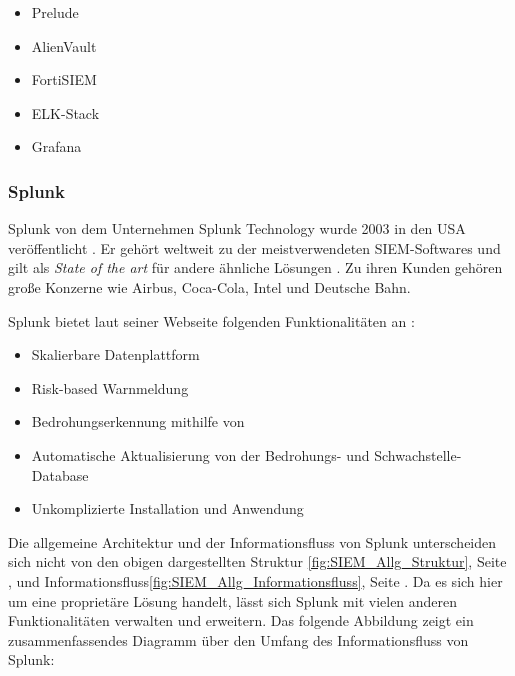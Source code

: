 \begin{itemize}[noitemsep]
   \item Prelude %
   \item AlienVault  %
   \item FortiSIEM %
   \item ELK-Stack %
   \item Grafana %
\end{itemize}


\newpage
\subsubsection{Splunk}
Splunk von dem Unternehmen Splunk Technology wurde 2003 in den USA veröffentlicht \citep{Splunk_splunk}. Er gehört weltweit zu der meistverwendeten \gls{SIEM}-Softwares und gilt als \textit{State of the art} für andere ähnliche Lösungen \citep{Kazarov_Splunk}. Zu ihren Kunden gehören große Konzerne wie Airbus, Coca-Cola, Intel und Deutsche Bahn. 

Splunk bietet laut seiner Webseite folgenden Funktionalitäten an \citep{Splunk_SPE}:

\begin{itemize}[noitemsep]
   \item Skalierbare Datenplattform 
   \item Risk-based Warnmeldung  
   \item Bedrohungserkennung mithilfe von  
   \item Automatische Aktualisierung von der Bedrohungs- und Schwachstelle-Database 
   \item Unkomplizierte Installation und Anwendung 
\end{itemize}

Die allgemeine Architektur und der Informationsfluss von Splunk unterscheiden sich nicht von den obigen dargestellten Struktur \ref{fig:SIEM_Allg_Struktur}, Seite \pageref{fig:SIEM_Allg_Struktur}, und Informationsfluss\ref{fig:SIEM_Allg_Informationsfluss}, Seite \pageref{fig:SIEM_Allg_Informationsfluss}. Da es sich hier um eine proprietäre Lösung handelt, lässt sich Splunk mit vielen anderen Funktionalitäten verwalten und erweitern. Das folgende Abbildung zeigt ein zusammenfassendes Diagramm über den Umfang des Informationsfluss von Splunk:


